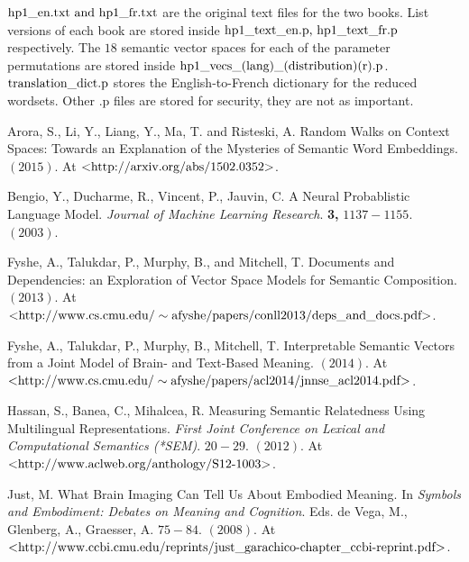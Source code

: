 \documentclass[12pt, usenames]{article}
\theoremstyle{definition}
\theoremstyle{definition}
\theoremstyle{definition}
\newcommand{\txt}[1]
{\textnormal{#1}}
\begin{document}
$\txt{hp1\_en.txt and hp1\_fr.txt}$ are the original text files for the two books. List versions of each book are stored inside $\txt{hp1\_text\_en.p,  hp1\_text\_fr.p}$ respectively. The $18$ semantic vector spaces for each of the parameter permutations are stored inside $\txt{hp1\_vecs\_(lang)\_(distribution)(r).p}$. $\txt{translation\_dict.p}$ stores the English-to-French dictionary for the reduced wordsets. Other .p files are stored for security, they are not as important.

\begin{thebibliography}{99} %

Arora, S., Li, Y., Liang, Y., Ma, T. and Risteski, A.
\newblock Random Walks on Context Spaces: Towards an Explanation of the Mysteries of Semantic Word Embeddings. $(2015)$. 
\newblock At \href{http://arxiv.org/abs/1502.0352}{$\txt{<http://arxiv.org/abs/1502.0352>}$}. 

Bengio, Y., Ducharme, R., Vincent, P., Jauvin, C.
\newblock A Neural Probablistic Language Model. 
\newblock \textit{Journal of Machine Learning Research}. \textbf{3,} $1137-1155$. $(2003)$. 

Fyshe, A., Talukdar, P., Murphy, B., and Mitchell, T.
\newblock Documents and Dependencies: an Exploration of Vector Space Models for Semantic Composition. $(2013)$.
\newblock At \href{http://www.cs.cmu.edu/~afyshe/papers/conll2013/deps_and_docs.pdf}{$\txt{<http://www.cs.cmu.edu/}\sim\txt{afyshe/papers/conll2013/deps\_and\_docs.pdf>}$}.

Fyshe, A., Talukdar, P., Murphy, B., Mitchell, T. 
\newblock Interpretable Semantic Vectors from a Joint Model of Brain- and Text-Based Meaning. $(2014)$.
\newblock At \href{http://www.cs.cmu.edu/~afyshe/papers/acl2014/jnnse_acl2014.pdf}{$\txt{<http://www.cs.cmu.edu/}\sim\txt{afyshe/papers/acl2014/jnnse\_acl2014.pdf>}$}.

Hassan, S., Banea, C., Mihalcea, R. 
\newblock Measuring Semantic Relatedness Using Multilingual Representations. 
\newblock \textit{First Joint Conference on Lexical and Computational Semantics (*SEM)}. $20-29$. $(2012)$.
\newblock At \href{http://www.aclweb.org/anthology/S12-1003}{$\txt{<http://www.aclweb.org/anthology/S12-1003>}$}. 

Just, M.
\newblock What Brain Imaging Can Tell Us About Embodied Meaning. 
\newblock In \textit{Symbols and Embodiment: Debates on Meaning and Cognition}. Eds. de Vega, M., Glenberg, A., Graesser, A. $75-84$. $(2008)$. 
\newblock At \href{http://www.ccbi.cmu.edu/reprints/just_garachico-chapter_ccbi-reprint.pdf}{$\txt{<http://www.ccbi.cmu.edu/reprints/just\_garachico-chapter\_ccbi-reprint.pdf>}$}. 


\end{thebibliography}
\end{document}
